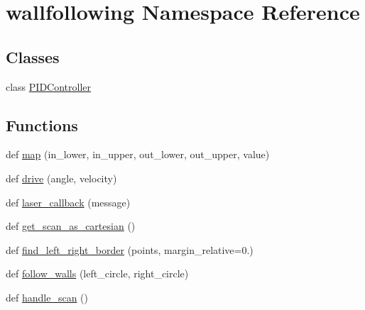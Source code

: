 \hypertarget{namespacewallfollowing}{}\section{wallfollowing Namespace Reference}
\label{namespacewallfollowing}
\subsection*{Classes}
\begin{DoxyCompactItemize}
\item 
class \hyperlink{classwallfollowing_1_1_p_i_d_controller}{P\+I\+D\+Controller}
\end{DoxyCompactItemize}
\subsection*{Functions}
\begin{DoxyCompactItemize}
\item 
def \hyperlink{namespacewallfollowing_a908b60b64e20dec7078e707a829b610d}{map} (in\+\_\+lower, in\+\_\+upper, out\+\_\+lower, out\+\_\+upper, value)
\item 
def \hyperlink{namespacewallfollowing_a66b98adda1f5c1ba1ed6c0029a5d27f6}{drive} (angle, velocity)
\item 
def \hyperlink{namespacewallfollowing_abaea68d69064fe86d2badf8535dd35a4}{laser\+\_\+callback} (message)
\item 
def \hyperlink{namespacewallfollowing_a31cb307c96c7aac244353e90506342cf}{get\+\_\+scan\+\_\+as\+\_\+cartesian} ()
\item 
def \hyperlink{namespacewallfollowing_a85455c82dd12c297c8cbc3227c1ba598}{find\+\_\+left\+\_\+right\+\_\+border} (points, margin\+\_\+relative=0.)
\item 
def \hyperlink{namespacewallfollowing_a4b2e06015971d569a9e05eb263ae210b}{follow\+\_\+walls} (left\+\_\+circle, right\+\_\+circle)
\item 
def \hyperlink{namespacewallfollowing_a3db0ade925064bd6564f1db9ef4ebec1}{handle\+\_\+scan} ()
\end{DoxyCompactItemize}
